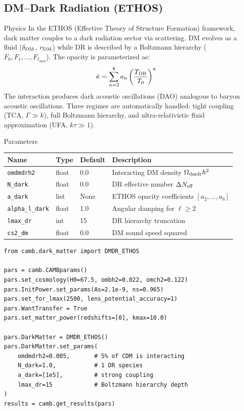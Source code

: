 \documentclass[11pt,a4paper]{article}
\begin{document}
\newpage
\subsection{DM--Dark Radiation (ETHOS)}
\label{sec:dmdr_ethos}

\begin{physbox}{Physics}
In the ETHOS (Effective Theory of Structure Formation) framework, dark matter couples to a dark radiation sector via scattering. DM evolves as a fluid ($\delta_{\rm DM}$, $v_{\rm DM}$) while DR is described by a Boltzmann hierarchy ($F_0, F_1, \ldots, F_{\ell_{\max}}$). The opacity is parameterized as:
\begin{equation}
    \dot{\kappa} = \sum_{n=2}^{6} a_n \left(\frac{T_{\rm DR}}{T_0}\right)^n
\end{equation}
The interaction produces dark acoustic oscillations (DAO) analogous to baryon acoustic oscillations. Three regimes are automatically handled: tight coupling (TCA, $\Gamma \gg k$), full Boltzmann hierarchy, and ultra-relativistic fluid approximation (UFA, $k\tau \gg 1$).
\end{physbox}

\begin{parambox}{Parameters}
\begin{tabular}{llll}
\toprule
Name & Type & Default & Description \\
\midrule
\texttt{omdmdrh2} & float & 0.0 & Interacting DM density $\Omega_{\rm dmdr}h^2$ \\
\texttt{N\_dark} & float & 0.0 & DR effective number $\Delta N_{\rm eff}$ \\
\texttt{a\_dark} & list & None & ETHOS opacity coefficients $[a_2, \ldots, a_6]$ \\
\texttt{alpha\_l\_dark} & float & 1.0 & Angular damping for $\ell \ge 2$ \\
\texttt{lmax\_dr} & int & 15 & DR hierarchy truncation \\
\texttt{cs2\_dm} & float & 0.0 & DM sound speed squared \\
\bottomrule
\end{tabular}
\end{parambox}

\begin{lstlisting}
from camb.dark_matter import DMDR_ETHOS

pars = camb.CAMBparams()
pars.set_cosmology(H0=67.5, ombh2=0.022, omch2=0.122)
pars.InitPower.set_params(As=2.1e-9, ns=0.965)
pars.set_for_lmax(2500, lens_potential_accuracy=1)
pars.WantTransfer = True
pars.set_matter_power(redshifts=[0], kmax=10.0)

pars.DarkMatter = DMDR_ETHOS()
pars.DarkMatter.set_params(
    omdmdrh2=0.005,       # 5% of CDM is interacting
    N_dark=1.0,           # 1 DR species
    a_dark=[1e5],         # strong coupling
    lmax_dr=15            # Boltzmann hierarchy depth
)
results = camb.get_results(pars)
\end{lstlisting}
\end{document}
